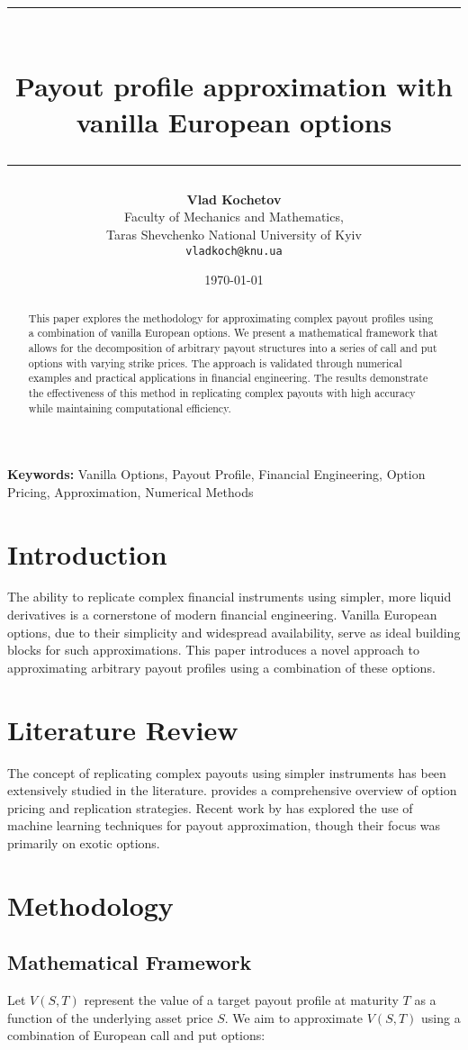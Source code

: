 \documentclass[12pt]{article}
\title{\rule{\textwidth}{4pt}\\[0.5cm]
\textbf{Payout profile approximation with vanilla European options}\\[0.5cm]
\rule{\textwidth}{2pt}}
\author{\small \textbf{Vlad Kochetov} \\
    \small Faculty of Mechanics and Mathematics, \\
    \small Taras Shevchenko National University of Kyiv \\
    \small \texttt{vladkoch@knu.ua}
}
\date{\today}
\providecommand{\keywords}[1]{\textbf{Keywords:} #1}
\begin{document}
\maketitle

\begin{abstract}
This paper explores the methodology for approximating complex payout profiles using a combination of vanilla European options. We present a mathematical framework that allows for the decomposition of arbitrary payout structures into a series of call and put options with varying strike prices. The approach is validated through numerical examples and practical applications in financial engineering. The results demonstrate the effectiveness of this method in replicating complex payouts with high accuracy while maintaining computational efficiency.
\end{abstract}

\keywords{Vanilla Options, 
          Payout Profile, 
          Financial Engineering, 
          Option Pricing, 
          Approximation,
          Numerical Methods}

\section{Introduction}
The ability to replicate complex financial instruments using simpler, more liquid derivatives is a cornerstone of modern financial engineering. Vanilla European options, due to their simplicity and widespread availability, serve as ideal building blocks for such approximations. This paper introduces a novel approach to approximating arbitrary payout profiles using a combination of these options.

\section{Literature Review}
The concept of replicating complex payouts using simpler instruments has been extensively studied in the literature. \cite{hull2018options} provides a comprehensive overview of option pricing and replication strategies. Recent work by \cite{smith2020financial} has explored the use of machine learning techniques for payout approximation, though their focus was primarily on exotic options.

\section{Methodology}
\subsection{Mathematical Framework}
Let \( V(S, T) \) represent the value of a target payout profile at maturity \( T \) as a function of the underlying asset price \( S \). We aim to approximate \( V(S, T) \) using a combination of European call and put options:
\end{document}
